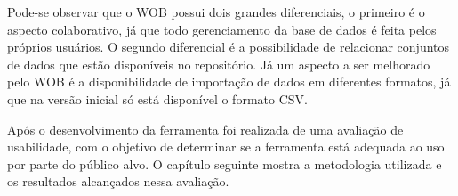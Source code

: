 Pode-se observar que o WOB possui dois grandes diferenciais, o primeiro é o aspecto colaborativo,
já que todo gerenciamento da base de dados é feita pelos próprios usuários. O segundo diferencial
é a possibilidade de relacionar conjuntos de dados que estão disponíveis no repositório. 
Já um aspecto a ser melhorado pelo WOB é a disponibilidade de importação de dados em 
diferentes formatos, já que na versão inicial só está disponível o formato CSV.

Após o desenvolvimento da ferramenta foi realizada de uma avaliação de usabilidade,
com o objetivo de determinar se a ferramenta está adequada ao uso por parte do público alvo.
O capítulo seguinte mostra a metodologia utilizada e os resultados alcançados nessa avaliação.